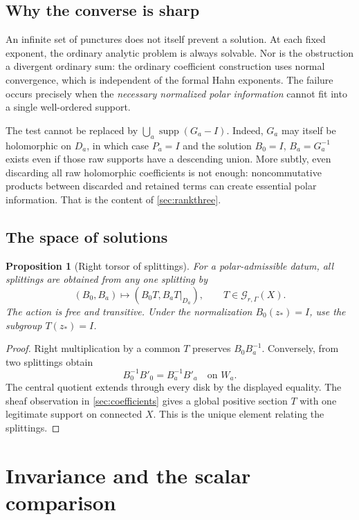 \documentclass[11pt,letterpaper]{article}
\newtheorem{proposition}[proposition]{Proposition}
\theoremstyle{definition}
\theoremstyle{remark}
\newcommand{\GG}{\mathscr G_{r,\Gamma}}
\newcommand{\supp}{\operatorname{supp}}
\numberwithin{equation}{section}
\begin{document}
\subsection{Why the converse is sharp}

An infinite set of punctures does not itself prevent a solution. At each fixed exponent, the ordinary analytic problem is always solvable. Nor is the obstruction a divergent ordinary sum: the ordinary coefficient construction uses normal convergence, which is independent of the formal Hahn exponents. The failure occurs precisely when the \emph{necessary normalized polar information} cannot fit into a single well-ordered support.

The test cannot be replaced by $\bigcup_a\supp(G_a-I)$. Indeed, $G_a$ may itself be holomorphic on $D_a$, in which case $P_a=I$ and the solution $B_0=I$, $B_a=G_a^{-1}$ exists even if those raw supports have a descending union. More subtly, even discarding all raw holomorphic coefficients is not enough: noncommutative products between discarded and retained terms can create essential polar information. That is the content of \cref{sec:rankthree}.

\subsection{The space of solutions}

\begin{proposition}[Right torsor of splittings]\label{prop:torsor}
For a polar-admissible datum, all splittings are obtained from any one splitting by
\[
 (B_0,B_a)\longmapsto(B_0T,B_aT|_{D_a}),
 \qquad T\in\GG(X).
\]
The action is free and transitive. Under the normalization $B_0(z_*)=I$, use the subgroup $T(z_*)=I$.
\end{proposition}

\begin{proof}
Right multiplication by a common $T$ preserves $B_0B_a^{-1}$. Conversely, from two splittings obtain
\[
 B_0^{-1}B'_0=B_a^{-1}B'_a\quad\text{on }W_a.
\]
The central quotient extends through every disk by the displayed equality. The sheaf observation in \cref{sec:coefficients} gives a global positive section $T$ with one legitimate support on connected $X$. This is the unique element relating the splittings.
\end{proof}

\section{Invariance and the scalar comparison}\label{sec:invariance}
\end{document}
